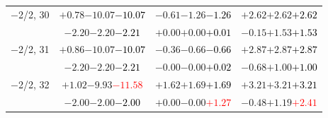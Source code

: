 \documentclass[compress]{beamer}
\begin{document}
\begin{frame}
\begin{tabular}{r | c | c | c}
$-$2/2, 30 & $+0.78$\hspace{0.1 cm}$-10.07$\hspace{0.1 cm}\textcolor{black}{$-10.07$} & $-0.61$\hspace{0.1 cm}$-1.26$\hspace{0.1 cm}\textcolor{black}{$-1.26$} & $+2.62$\hspace{0.1 cm}$+2.62$\hspace{0.1 cm}\textcolor{black}{$+2.62$} \\
           & $-2.20$\hspace{0.1 cm}$-2.20$\hspace{0.1 cm}\textcolor{black}{$-2.21$} & $+0.00$\hspace{0.1 cm}$+0.00$\hspace{0.1 cm}\textcolor{black}{$+0.01$} & $-0.15$\hspace{0.1 cm}$+1.53$\hspace{0.1 cm}\textcolor{black}{$+1.53$} \\
$-$2/2, 31 & $+0.86$\hspace{0.1 cm}$-10.07$\hspace{0.1 cm}\textcolor{black}{$-10.07$} & $-0.36$\hspace{0.1 cm}$-0.66$\hspace{0.1 cm}\textcolor{black}{$-0.66$} & $+2.87$\hspace{0.1 cm}$+2.87$\hspace{0.1 cm}\textcolor{black}{$+2.87$} \\
           & $-2.20$\hspace{0.1 cm}$-2.20$\hspace{0.1 cm}\textcolor{black}{$-2.21$} & $-0.00$\hspace{0.1 cm}$-0.00$\hspace{0.1 cm}\textcolor{black}{$+0.02$} & $-0.68$\hspace{0.1 cm}$+1.00$\hspace{0.1 cm}\textcolor{black}{$+1.00$} \\
$-$2/2, 32 & $+1.02$\hspace{0.1 cm}$-9.93$\hspace{0.1 cm}\textcolor{red}{$-11.58$} & $+1.62$\hspace{0.1 cm}$+1.69$\hspace{0.1 cm}\textcolor{black}{$+1.69$} & $+3.21$\hspace{0.1 cm}$+3.21$\hspace{0.1 cm}\textcolor{black}{$+3.21$} \\
           & $-2.00$\hspace{0.1 cm}$-2.00$\hspace{0.1 cm}\textcolor{black}{$-2.00$} & $+0.00$\hspace{0.1 cm}$-0.00$\hspace{0.1 cm}\textcolor{red}{$+1.27$} & $-0.48$\hspace{0.1 cm}$+1.19$\hspace{0.1 cm}\textcolor{red}{$+2.41$} \\

\end{tabular}
\end{frame}
\end{document}
